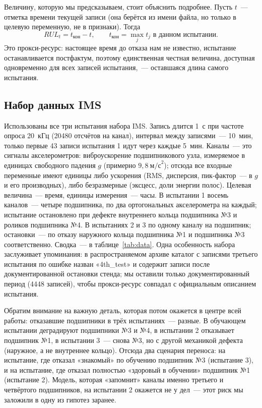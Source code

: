 \documentclass[14pt,a4paper]{extarticle}
\begin{document}
Величину, которую мы предсказываем, стоит объяснить подробнее. Пусть $t$~---
отметка времени текущей записи (она берётся из имени файла, но только
в целевую переменную, не в признаки). Тогда
\begin{equation}
RUL_t = t_{\text{кон}} - t, \qquad t_{\text{кон}} = \max_j t_j \text{ в данном испытании}.
\label{eq:rul}
\end{equation}
Это прокси-ресурс: настоящее время до отказа нам не известно, испытание
останавливается постфактум, поэтому единственная честная величина, доступная
одновременно для всех записей испытания,~--- оставшаяся длина самого
испытания.

\subsection{Набор данных IMS}

Использованы все три испытания набора IMS. Запись длится 1~с при частоте
опроса 20~кГц (20480 отсчётов на канал), интервал между записями~--- 10~мин,
только первые 43 записи испытания 1 идут через каждые 5~мин. Каналы~--- это
сигналы акселерометров: виброускорение подшипникового узла, измеряемое
в единицах свободного падения $g$ (примерно $9{,}8~\text{м/с}^2$);
отсюда все входные переменные имеют единицы либо ускорения (RMS,
дисперсия, пик-фактор~--- в $g$ и его производных), либо безразмерные
(эксцесс, доли энергии полос). Целевая величина~--- время, единицы
измерения~--- часы. В испытании 1
восемь каналов~--- четыре подшипника, по два ортогональных акселерометра
на каждый; испытание остановлено при дефекте внутреннего кольца подшипника
№3 и роликов подшипника №4. В испытаниях 2 и 3 по одному каналу
на подшипник; остановки~--- по отказу наружного кольца подшипника №1
и подшипника №3 соответственно. Сводка~--- в таблице~\ref{tab:data}.
Одна особенность набора заслуживает упоминания: в распространяемом архиве
каталог с записями третьего испытания по ошибке назван «4th\_test»
и содержит записи после документированной остановки стенда; мы оставили
только документированный период (4448 записей), чтобы прокси-ресурс
совпадал с официальным описанием испытания.



Обратим внимание на важную деталь, которая потом окажется в центре всей
работы: отказавшие подшипники в трёх испытаниях~--- разные. В обучающем
испытании деградируют подшипники №3 и №4, в испытании 2 отказывает
подшипник №1, в испытании 3~--- снова №3, но с другой механикой дефекта
(наружное, а не внутреннее кольцо). Отсюда два сценария переноса:
на испытание, где отказал «знакомый» по обучению подшипник №3
(испытание 3), и на испытание, где отказал полностью «здоровый в обучении»
подшипник №1 (испытание 2). Модель, которая «запомнит» каналы именно
третьего и четвёртого подшипников, на испытании 2 окажется не у дел~---
этот риск мы заложили в одну из гипотез заранее.
\end{document}
